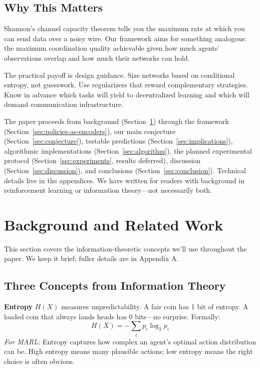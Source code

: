 \documentclass[10pt, letterpaper]{article}
\begin{document}
\subsection*{Why This Matters}

Shannon's channel capacity theorem tells you the maximum rate at which you can send data over a noisy wire. Our framework aims for something analogous: the maximum coordination quality achievable given how much agents' observations overlap and how much their networks can hold.

The practical payoff is design guidance. Size networks based on conditional entropy, not guesswork. Use regularizers that reward complementary strategies. Know in advance which tasks will yield to decentralized learning and which will demand communication infrastructure.

The paper proceeds from background (Section~\ref{sec:background}) through the framework (Section~\ref{sec:policies-as-encoders}), our main conjecture (Section~\ref{sec:conjecture}), testable predictions (Section~\ref{sec:implications}), algorithmic implementations (Section~\ref{sec:algorithm}), the planned experimental protocol (Section~\ref{sec:experiments}, results deferred), discussion (Section~\ref{sec:discussion}), and conclusions (Section~\ref{sec:conclusion}). Technical details live in the appendices. We have written for readers with background in reinforcement learning or information theory---not necessarily both.

\section{Background and Related Work}
\label{sec:background}

This section covers the information-theoretic concepts we'll use throughout the paper. We keep it brief; fuller details are in Appendix A.

\subsection{Three Concepts from Information Theory}

\textbf{Entropy} $H(X)$ measures unpredictability. A fair coin has 1 bit of entropy. A loaded coin that always lands heads has 0 bits---no surprise. Formally:
\[H(X) = -\sum_{i} p_i \log_2 p_i\]
\emph{For MARL:} Entropy captures how complex an agent's optimal action distribution can be. High entropy means many plausible actions; low entropy means the right choice is often obvious.
\end{document}
